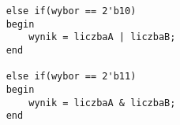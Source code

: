 \begin{lstlisting}
	else if(wybor == 2'b10)
	begin
		wynik = liczbaA | liczbaB;
	end
	
	else if(wybor == 2'b11)
	begin
		wynik = liczbaA & liczbaB;
	end
\end{lstlisting}